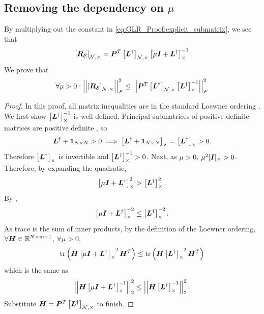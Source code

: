 \subsection{Removing the dependency on $\mu$}
\label{subapp:GLR_Proof:no_more_mu}
By multiplying out the constant in \ref{eq:GLR_Proof:explicit_submatrix}, we see that
\begin{align}
    \msub[N,\Theta]{\matr{R}_{\set{S}}} = \matr{P}^{T}\msub[N,\Theta]{\matr{L}^{\dagger}}\msub[\Theta]{\mu\matr{I} + \matr{L}^{\dagger}}^{-1} \label{eq:GLR_thm_proof:RSNTheta}
\end{align}
We prove that
\begin{align}
    \forall \mu > 0: \sqfrob{\msub[N,\Theta]{\matr{R}_{\set{S}}}} \leq \sqfrob{\matr{P}^{T}\msub[N,\Theta]{\matr{L}^{\dagger}}\msub[\Theta]{\matr{L}^{\dagger}}^{-1}} \label{eq:GLR_Proof:no_more_mu}
\end{align}
\begin{proof}
In this proof, all matrix inequalities are in the standard Loewner ordering \cite[pg. 112]{bhatia2013matrix}. We first show $\msub[\Theta]{\matr{L}^{\dagger}}^{-1}$ is well defined. Principal submatrices of positive definite matrices are positive definite \cite[Corollary III.1.5]{bhatia2013matrix}, so
    \begin{equation}
         \matr{L}^{\dagger} + \vect{1}_{N \times N} >0 \implies \msub[\Theta]{\matr{L}^{\dagger} + \matr{1}_{N \times N}} =\msub[\Theta]{\matr{L}^{\dagger}} >0.
    \end{equation}
    Therefore $\msub[\Theta]{\matr{L}^{\dagger}}$ is invertible and   $\msub[\Theta]{\matr{L}^{\dagger}}^{-1} >0$. Next, as $\mu >0$, $\mu^{2}\matrsub[\Theta]{I} > 0$. Therefore, by expanding the quadratic,
    \begin{equation}    
         \msub[\Theta]{\mu\matr{I} + \matr{L}^{\dagger}}^{2} > \msub[\Theta]{\matr{L}^{\dagger}}^{2}.
    \end{equation}
    By \cite[Proposition V.1.6, page 114]{bhatia2013matrix},
    \begin{equation}
        \msub[\Theta]{\mu\matr{I} + \matr{L}^{\dagger}}^{-2} \leq \msub[\Theta]{\matr{L}^{\dagger}}^{-2}.
    \end{equation}
    As trace is the sum of inner products, by the definition of the Loewner ordering, $\forall \bm{H}\in \mathbb{R}^{N \times m-1}$, $\forall \mu>0$,
    \begin{equation}
        \trace{\matr{H}\msub[\Theta]{\mu\matr{I} + \matr{L}^{\dagger}}^{-2} \matr{H}^{T}} \leq \trace{\matr{H}\msub[\Theta]{\matr{L}^{\dagger}}^{-2}\matr{H}^{T}}
    \end{equation}
    which is the same as
    \begin{equation}
     \sqnormvec{\matr{H}\msub[\Theta]{\mu\matr{I} + \matr{L}^{\dagger}}^{-1} } \leq \sqnormvec{\matr{H}\msub[\Theta]{\matr{L}^{\dagger}}^{-1}}.
    \end{equation}
    Substitute $\matr{H} = \matr{P}^{T}\msub[\set{N},\Theta]{\matr{L}^{\dagger}}$ to finish.
    
\end{proof}
